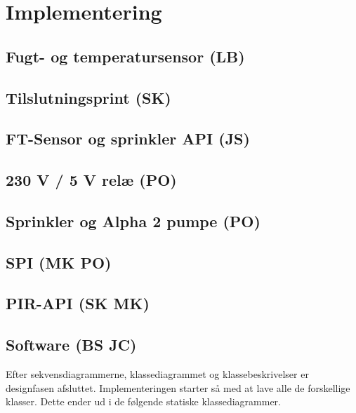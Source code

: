 \chapter{Implementering}

\section{Fugt- og temperatursensor (LB)}


\section{Tilslutningsprint (SK)}


\section{FT-Sensor og sprinkler API (JS)}


\section{230 V / 5 V relæ (PO)}


\section{Sprinkler og Alpha 2 pumpe (PO)}


\newpage
\section{SPI (MK PO)}


\section{PIR-API (SK MK)}


\section{Software (BS JC)}
Efter sekvensdiagrammerne, klassediagrammet og klassebeskrivelser er designfasen afsluttet. Implementeringen starter så med at lave alle de forskellige klasser. Dette ender ud i de følgende statiske klassediagrammer.

